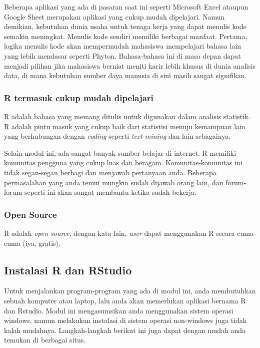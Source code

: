 \documentclass[
]{book}
\begin{document}
Beberapa aplikasi yang ada di pasaran saat ini seperti Microsoft Excel ataupun Google Sheet merupakan aplikasi yang cukup mudah dipelajari. Namun demikian, kebutuhan dunia usaha untuk tenaga kerja yang dapat menulis kode semakin meningkat. Menulis kode sendiri memiliki berbagai manfaat. Pertama, logika menulis kode akan mempermudah mahasiswa mempelajari bahasa lain yang lebih mendasar seperti Phyton. Bahasa-bahasa ini di masa depan dapat menjadi pilihan jika mahasiswa berniat meniti karir lebih khusus di dunia analisis data, di mana kebutuhan sumber daya manusia di sini masih sangat signifikan.

\hypertarget{r-termasuk-cukup-mudah-dipelajari}{%
\subsubsection{R termasuk cukup mudah dipelajari}\label{r-termasuk-cukup-mudah-dipelajari}}

R adalah bahasa yang memang ditulis untuk digunakan dalam analisis statistik. R adalah pintu masuk yang cukup baik dari statistisi menuju kemampuan lain yang berhubungan dengan \emph{coding} seperti \emph{text mining} dan lain sebagainya.

Selain modul ini, ada sangat banyak sumber belajar di internet. R memiliki komunitas pengguna yang cukup luas dan beragam. Komunitas-komunitas ini tidak segan-segan berbagi dan menjawab pertanyaan anda. Beberapa permasalahan yang anda temui mungkin sudah dijawab orang lain, dan forum-forum seperti ini akan sangat membantu ketika sudah bekerja.

\hypertarget{open-source}{%
\subsubsection{Open Source}\label{open-source}}

R adalah \emph{open source}, dengan kata lain, \emph{user} dapat menggunakan R secara cuma-cuma (iya, gratis).

\hypertarget{instalasi-r-dan-rstudio}{%
\subsection{Instalasi R dan RStudio}\label{instalasi-r-dan-rstudio}}

Untuk menjalankan program-program yang ada di modul ini, anda membutuhkan sebuah komputer atau laptop, lalu anda akan memerlukan aplikasi bernama R dan Rstudio. Modul ini mengasumsikan anda menggunakan sistem operasi windows, namun melakukan instalasi di sistem operasi non-windows juga tidak kalah mudahnya. Langkah-langkah berikut ini juga dapat dengan mudah anda temukan di berbagai situs.
\end{document}
